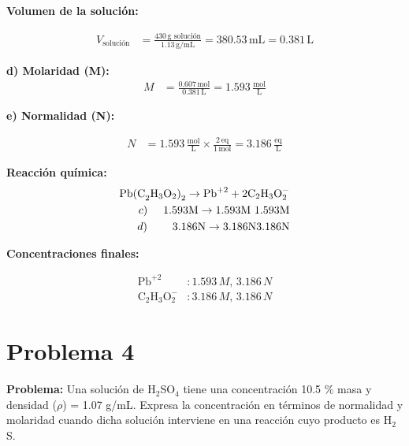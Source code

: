 \documentclass{article}
\begin{document}
\textbf{Volumen de la solución:}

\begin{align*}
    V_{\text{solución}} &= \frac{430 \, \text{g solución}}{1.13 \, \text{g/mL}} = 380.53 \, \text{mL} = 0.381 \, \text{L}
\end{align*}

\textbf{d) Molaridad (M):}
\begin{align*}
    M &= \frac{0.607 \, \text{mol}}{0.381 \, \text{L}} = 1.593 \, \frac{\text{mol}}{\text{L}}
\end{align*}

\textbf{e) Normalidad (N):}

\begin{align*}
    N &= 1.593 \, \frac{\text{mol}}{\text{L}} \times \frac{2 \, \text{eq}}{1 \, \text{mol}} = 3.186 \, \frac{\text{eq}}{\text{L}}
\end{align*}

\textbf{Reacción química:}
\begin{align*}
    \text{Pb(C}_2\text{H}_3\text{O}_2\text{)}_2 \rightarrow \text{Pb}^{+2} + 2\text{C}_2\text{H}_3\text{O}_2^{-} \\
    c) \hspace{0.5cm} \text{1.593M} \rightarrow \text{1.593M } \text{1.593M} \\
    d) \hspace{0.8cm} \text{3.186N} \rightarrow \text{3.186N} \text{3.186N}
\end{align*}

\textbf{Concentraciones finales:}

\begin{align*}
    \text{Pb}^{+2} &: 1.593 \, M, \, 3.186 \, N \\[10pt]
    \text{C}_2\text{H}_3\text{O}_2^{-} &: 3.186 \, M, \, 3.186 \, N
\end{align*}










\newpage
\section*{Problema 4}
\textbf{Problema:} Una solución de H$_2$SO$_4$ tiene una concentración 10.5 \% masa y densidad ($\rho$) = 1.07 g/mL. Expresa la concentración en términos de normalidad y molaridad cuando dicha solución interviene en una reacción cuyo producto es H$_2$S.
\end{document}
